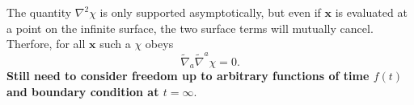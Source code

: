 \documentclass[10pt,letterpaper]{article}
\numberwithin{equation}{subsection}
\begin{document}
The quantity $\nabla^2 \chi$ is only supported asymptotically, but even if $\mathbf x$ is evaluated at a point on the infinite surface, the two surface terms will mutually cancel. Therfore, for all $\mathbf x$ such a $\chi$ obeys 
\begin{equation}
\tilde\nabla_a\tilde\nabla^a \chi = 0.
\end{equation}
\textbf{Still need to consider freedom up to arbitrary functions of time $f(t)$ and boundary condition at $t=\infty$}.
\end{document}
